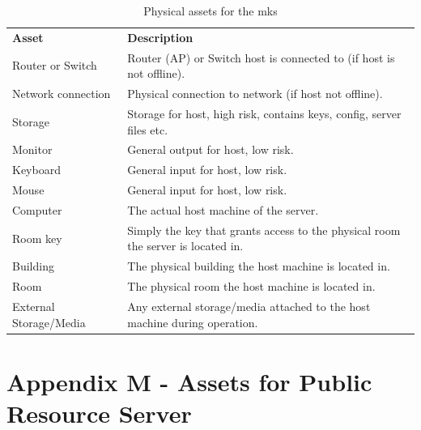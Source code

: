 \begin{appendices}
\begin{table}[htp]
  \begin{tabularx}{\linewidth}{lX}
    \textbf{Asset}          & \textbf{Description} \\
    Router or Switch        &	Router (AP) or Switch host is connected to (if host is not offline). \\
    Network connection      &	Physical connection to network (if host not offline). \\
    Storage                 &	Storage for host, high risk, contains keys, config, server files etc. \\
    Monitor                 &	General output for host, low risk. \\
    Keyboard                &	General input for host, low risk. \\
    Mouse                   &	General input for host, low risk. \\
    Computer                &	The actual host machine of the server. \\
    Room key                &	Simply the key that grants access to the physical room the server is located in. \\
    Building                &	The physical building the host machine is located in. \\
    Room                    &	The physical room the host machine is located in. \\
    External Storage/Media  &	Any external storage/media attached to the host machine during operation. \\
  \end{tabularx}
  \caption{Physical assets for the \acrfull{mks}}
  \label{tab:physical_assets_mk}
\end{table}

\clearpage

\section{Appendix M - Assets for Public Resource Server}
\label{appendix:prs_assets}


\end{appendices}

